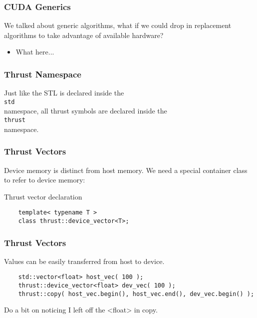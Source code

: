 \begin{frame}
  \frametitle{CUDA Generics}
  We talked about generic algorithms, what if we could drop in
  replacement algorithms to take advantage of available hardware?
  \begin{itemize}
    \item What here...
  \end{itemize}
\end{frame}

\begin{frame}[fragile]
  \frametitle{Thrust Namespace}
  Just like the STL is declared inside the \\
  \vspace{.5cm}\hspace{1cm}\lstinline|std|\vspace{.5cm} \\
  namespace, all thrust symbols are declared inside the \\
  \vspace{.5cm}\hspace{1cm}\lstinline|thrust|\vspace{.5cm} \\
  namespace.
\end{frame}

\begin{frame}[fragile]
  \frametitle{Thrust Vectors}
  Device memory is distinct from host memory. We need a special
  container class to refer to device memory:
  \begin{block}{Thrust vector declaration}
    \begin{lstlisting}
    template< typename T >
    class thrust::device_vector<T>;
    \end{lstlisting}
  \end{block}
\end{frame}

\begin{frame}[fragile]
  \frametitle{Thrust Vectors}
  Values can be easily transferred from host to device.
  \begin{example}
    \begin{lstlisting}
    std::vector<float> host_vec( 100 );
    thrust::device_vector<float> dev_vec( 100 );
    thrust::copy( host_vec.begin(), host_vec.end(), dev_vec.begin() );
    \end{lstlisting}
  \end{example}
  Do a bit on noticing I left off the <float> in copy.
\end{frame}

